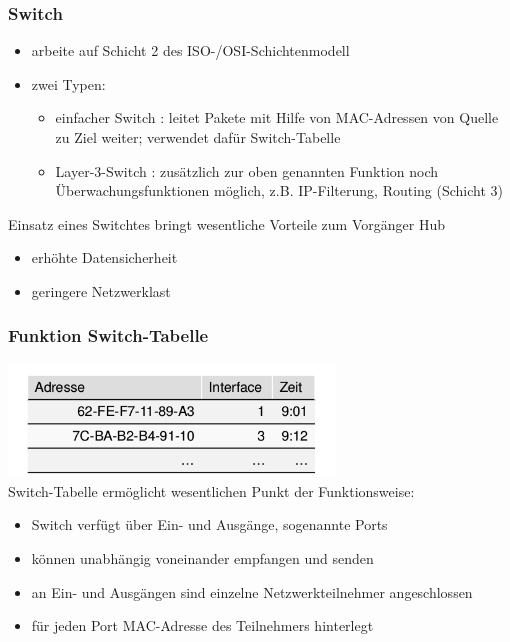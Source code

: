 \documentclass{beamer}
\begin{document}
        \begin{frame}
          	\frametitle{Switch}
            	\begin{itemize}
            	\item arbeite auf Schicht 2 des ISO-/OSI-Schichtenmodell
            	\item zwei Typen:
            	\begin{itemize}
            	\item einfacher Switch : leitet Pakete mit Hilfe von MAC-Adressen von Quelle zu Ziel weiter; verwendet dafür Switch-Tabelle
            	\item Layer-3-Switch : zusätzlich zur oben genannten Funktion noch Überwachungsfunktionen möglich, z.B. IP-Filterung, Routing (Schicht 3)
            	\end{itemize}
            	\end{itemize}
            	Einsatz eines Switchtes bringt wesentliche Vorteile zum Vorgänger Hub
            	\begin{itemize}
            		\item erhöhte Datensicherheit
            		\item geringere Netzwerklast	
            	\end{itemize}
        \end{frame}
        
        \begin{frame}
        	\frametitle{Funktion Switch-Tabelle}
        	\includegraphics[height=3.0cm]{switch-tabelle.png}\\
        	Switch-Tabelle ermöglicht wesentlichen Punkt der Funktionsweise:
        	\begin{itemize}
        	\item Switch verfügt über Ein- und Ausgänge, sogenannte Ports
        	\item können unabhängig voneinander empfangen und senden
        	\item an Ein- und Ausgängen sind einzelne Netzwerkteilnehmer angeschlossen
        	\item für jeden Port MAC-Adresse des Teilnehmers hinterlegt
        	\end{itemize}  	
    	\end{frame}
    	
\end{document}
